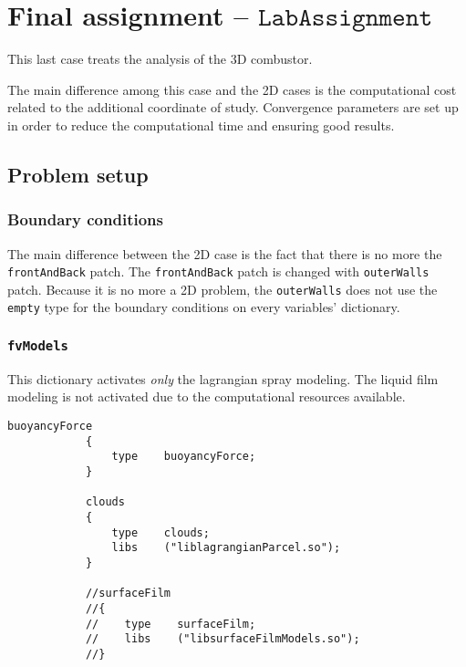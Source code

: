 
\section{Final assignment -- $\mathtt{LabAssignment}$}
    
    \renewcommand{\thepage}{\arabic{page}}
    \setcounter{page}{\thelastPage}
    
    This last case treats the analysis of the 3D combustor. 

    The main difference among this case and the 2D cases is the computational cost related to the additional coordinate of study. Convergence parameters are set up in order to reduce the computational time and ensuring good results. 

    \subsection{Problem setup}
    \subsubsection{Boundary conditions}
    The main difference between the 2D case is the fact that there is no more the \verb|frontAndBack| patch. The \verb|frontAndBack| patch is changed with \verb|outerWalls| patch. 
    Because it is no more a 2D problem, the \verb|outerWalls| does not use the \verb|empty| type for the boundary conditions on every variables' dictionary. 

    \cprotect\subsubsection{\verb|fvModels|}
    This dictionary activates \textit{only} the lagrangian spray modeling. The liquid film modeling is not activated due to the computational resources available.
    \begin{lstlisting}[caption = $\mathtt{combustorReaction/constant/fvModels}$ activates only lagrangian spray model and the bouyancy forces., label = list:fvModels]
            buoyancyForce
            {
                type    buoyancyForce;
            }

            clouds
            {
                type    clouds;
                libs    ("liblagrangianParcel.so");
            }

            //surfaceFilm
            //{
            //    type    surfaceFilm;
            //    libs    ("libsurfaceFilmModels.so");
            //}
    \end{lstlisting}
    
